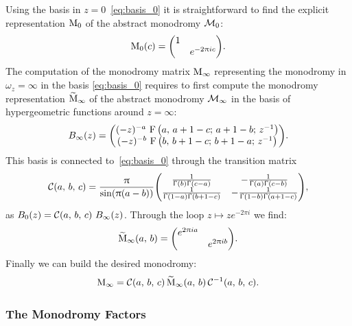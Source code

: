 Using the basis in $z = 0$~\eqref{eq:basis_0} it is straightforward to find the explicit representation $\mathrm{M}_{0}$ of the abstract monodromy $\mathcal{M}_{0}$:
\begin{equation}
  \rM_{0}( c ) = \mqty( \dmat{1, e^{-2\pi i c}} ).
  \label{eq:monodromy_zero}
\end{equation}
The computation of the monodromy matrix $\mathrm{M}_{\infty}$ representing the monodromy in $\omega_z  =\infty$ in the basis \eqref{eq:basis_0} requires to first compute the monodromy representation $\widetilde{\mathrm{M}}_{\infty}$ of the abstract monodromy $\mathcal{M}_{\infty}$ in the basis of hypergeometric functions around $z = \infty$:
\begin{equation}
  B_{\infty}(z)
  =
  \mqty(
    (-z)^{-a}~\hyp{a}{a+1-c}{a+1-b}{z^{-1}}
    \\
    (-z)^{-b}~\hyp{b}{b+1-c}{b+1-a}{z^{-1}}
  ).
\end{equation}
This basis is connected to~\eqref{eq:basis_0} through the transition matrix
\begin{equation}
  \cC( a,\, b,\, c )
  =
  \frac{\pi}{\sin(\pi(a-b))}
  \mqty(
    \frac{1}{\gfun{b}\gfun{c-a}}
    &
    -\frac{1}{\gfun{a} \gfun{c-b}}
    \\
    \frac{1}{\gfun{1-a}\gfun{b+1-c}}
    &
    -\frac{1}{\gfun{1-b}\gfun{a+1-c}}
  ),
  \label{eq:transition_matrix}
\end{equation}
as $B_{0}(z) = \mathcal{C}(a,\, b,\, c)~B_{\infty}(z)$.
Through the loop $z \mapsto z e^{-2\pi i}$ we find:
\begin{equation}
  \trM_{\infty}( a,\, b )
  =
  \mqty( \dmat{e^{2\pi i a}, e^{2\pi i b}} ).
\end{equation}
Finally we can build the desired monodromy:
\begin{equation}
  \mathrm{M}_{\infty}
  =
  \mathcal{C}(a,\, b,\, c)\,
  \widetilde{\mathrm{M}}_{\infty}(a,\, b)\,
  \mathcal{C}^{-1}(a,\, b,\, c).
  \label{eq:monodromy_infty}
\end{equation}


\subsubsection{The Monodromy Factors}

